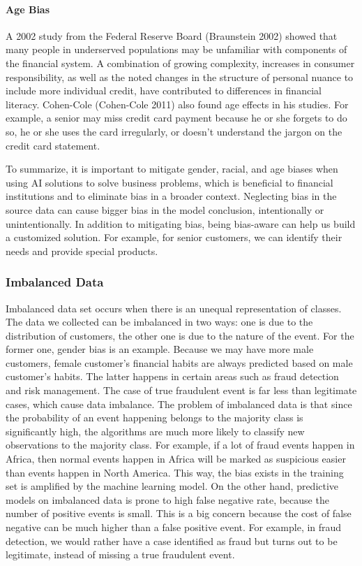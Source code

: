 \documentclass{article}
\begin{document}
\paragraph{Age Bias}
A 2002 study from the Federal Reserve Board (Braunstein 2002) showed that many people in underserved populations may be unfamiliar with components of the financial system. A combination of growing complexity, increases in consumer responsibility, as well as the noted changes in the structure of personal nuance to include more individual credit, have contributed to differences in financial literacy.
Cohen-Cole (Cohen-Cole 2011) also found age effects in his studies. For example, a senior may miss credit card payment because he or she forgets to do so, he or she uses the card irregularly, or doesn't understand the jargon on the credit card statement.

To summarize, it is important to mitigate gender, racial, and age biases when using AI solutions to solve business problems, which is beneficial to financial institutions and to eliminate bias in a broader context. Neglecting bias in the source data can cause bigger bias in the model conclusion, intentionally or unintentionally. In addition to mitigating bias, being bias-aware can help us build a customized solution. For example, for senior customers, we can identify their needs and provide special products.

\subsubsection{Imbalanced Data}
Imbalanced data set occurs when there is an unequal representation of classes. The data we collected can be imbalanced in two ways: one is due to the distribution of customers, the other one is due to the nature of the event. For the former one, gender bias is an example. Because we may have more male customers, female customer's financial habits are always predicted based on male customer's habits. The latter happens in certain areas such as fraud detection and risk management. The case of true fraudulent event is far less than legitimate cases, which cause data imbalance. The problem of imbalanced data is that since the probability of an event happening belongs to the majority class is significantly high, the algorithms are much more likely to classify new observations to the majority class. For example, if a lot of fraud events happen in Africa, then normal events happen in Africa will be marked as suspicious easier than events happen in North America. This way, the bias exists in the training set is amplified by the machine learning model. On the other hand, predictive models on imbalanced data is prone to high false negative rate, because the number of positive events is small. This is a big concern because the cost of false negative can be much higher than a false positive event. For example, in fraud detection, we would rather have a case identified as fraud but turns out to be legitimate, instead of missing a true fraudulent event.  
\end{document}
